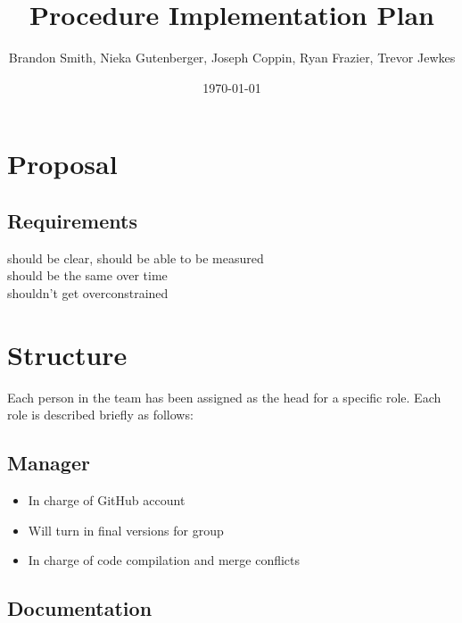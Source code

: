 \documentclass[11pt, titlepage]{article}
\author{Brandon Smith, Nieka Gutenberger, Joseph Coppin, Ryan Frazier, Trevor Jewkes}
\title{Procedure Implementation Plan}
\date{\today}
\begin{document}
	\maketitle
    \setcounter{tocdepth}{1}
\section{Proposal}    
    
    \subsection{Requirements}
    
    \par should be clear, should be able to be measured\\
    should be the same over time\\
    shouldn't get overconstrained\\
    
    \section{Structure}
    	Each person in the team has been assigned as the head for a specific role.  		Each role is described briefly as follows:
    
    \subsection{Manager} 
    
    	\begin{itemize}
    		\item In charge of GitHub account
    		\item Will turn in final versions for group
    		\item In charge of code compilation and merge conflicts
    	\end{itemize}
   
    \subsection{Documentation}
    
\end{document}
